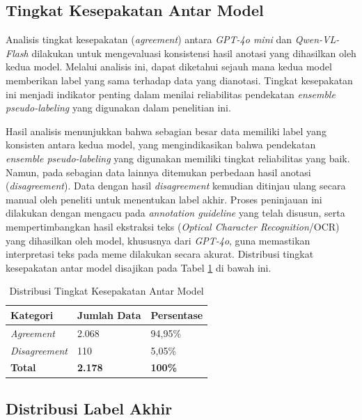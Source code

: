 \subsection{Tingkat Kesepakatan Antar Model} \label{IV.Anotasi.Agreement}
Analisis tingkat kesepakatan (\textit{agreement}) antara \textit{GPT-4o mini} dan \textit{Qwen-VL-Flash} dilakukan untuk mengevaluasi konsistensi hasil anotasi yang dihasilkan oleh kedua model. Melalui analisis ini, dapat diketahui sejauh mana kedua model memberikan label yang sama terhadap data yang dianotasi. Tingkat kesepakatan ini menjadi indikator penting dalam menilai reliabilitas pendekatan \textit{ensemble pseudo-labeling} yang digunakan dalam penelitian ini.

Hasil analisis menunjukkan bahwa sebagian besar data memiliki label yang konsisten antara kedua model, yang mengindikasikan bahwa pendekatan \textit{ensemble pseudo-labeling} yang digunakan memiliki tingkat reliabilitas yang baik. Namun, pada sebagian data lainnya ditemukan perbedaan hasil anotasi (\textit{disagreement}). Data dengan hasil \textit{disagreement} kemudian ditinjau ulang secara manual oleh peneliti untuk menentukan label akhir. Proses peninjauan ini dilakukan dengan mengacu pada \textit{annotation guideline} yang telah disusun, serta mempertimbangkan hasil ekstraksi teks (\textit{Optical Character Recognition}/OCR) yang dihasilkan oleh model, khususnya dari \textit{GPT-4o}, guna memastikan interpretasi teks pada meme dilakukan secara akurat. Distribusi tingkat kesepakatan antar model disajikan pada Tabel \ref{table:4.agreement_distribution} di bawah ini.

\begin{table}[H]
    \centering
    \caption{Distribusi Tingkat Kesepakatan Antar Model}
    \label{table:4.agreement_distribution}
    \small
    \setlength{\tabcolsep}{3pt}
    \renewcommand{\arraystretch}{1.1}
    \begin{tabular}{p{2.5cm} p{2.5cm} p{2cm}}
        \hline
        \textbf{Kategori} & \textbf{Jumlah Data} & \textbf{Persentase} \\
        \hline
        \textit{Agreement} & 2.068 & 94,95\% \\
        \textit{Disagreement} & 110 & 5,05\% \\
        \textbf{Total} & \textbf{2.178} & \textbf{100\%} \\
        \hline
    \end{tabular}
\end{table}

\subsection{Distribusi Label Akhir} \label{IV.Anotasi.Distribusi}

